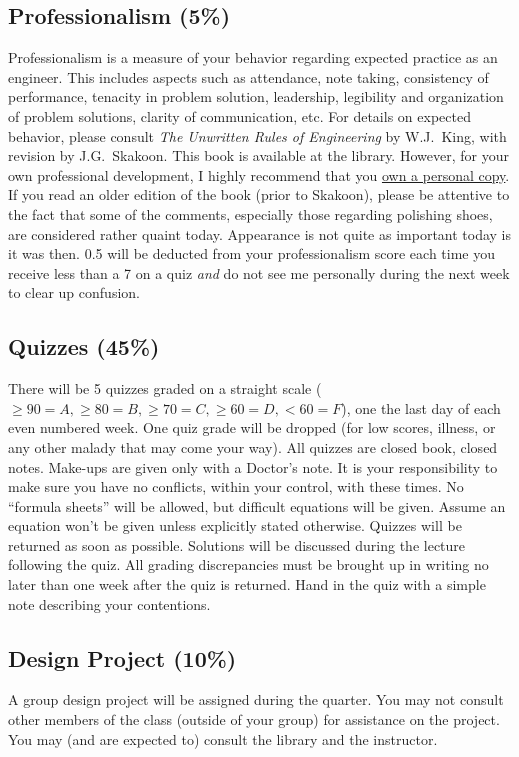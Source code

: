 \documentclass[10pt]{article}
\begin{document}
\subsection*{Professionalism (5\%)}
Professionalism is a measure of your behavior regarding expected practice as an engineer. This includes aspects such as attendance, note taking, consistency of performance, tenacity in problem solution, leadership, legibility and organization of problem solutions, clarity of communication, etc. For details on expected behavior, please consult \emph{The Unwritten Rules of Engineering} by W.J.~King, with revision by  J.G.~Skakoon. This book is available at the library. However, for your own professional development, I highly recommend that you \href{http://members.asme.org/catalog/ItemView.cfm?ItemNumber=801624}{own a personal copy}. If you read an older edition of the book (prior to Skakoon), please be attentive to the fact that some of the comments, especially those regarding polishing shoes, are considered rather quaint today. Appearance is not quite as important today is it was then. 0.5 will be deducted from your professionalism score each time you receive less than a 7 on a quiz \emph{and} do not see me personally during the next week to clear up confusion. 

\subsection*{Quizzes (45\%)}
There will be 5 quizzes graded on a straight scale ($\geq 90 = A,\geq 80 = B, \geq 70 = C, \geq 60 = D, < 60 = F$), one the last day of each even numbered week.  %
One quiz grade will be dropped (for low scores, illness, or any other malady that may come your way).  All quizzes are closed book, closed notes.  Make-ups are given only with a Doctor's note.  It is your responsibility to make sure you have no conflicts, within your control, with these times.  No ``formula sheets'' will be allowed, but difficult equations will be given.  Assume an equation won't be given unless explicitly stated otherwise. Quizzes will be returned as soon as possible.  Solutions will be discussed during the lecture following the quiz.  All grading discrepancies must be brought up in writing no later than one week after the quiz is returned.  Hand in the quiz with a simple note describing your contentions.

\subsection*{Design Project (10\%)}
A group design project will be assigned during the quarter. You may not consult other members of the class (outside of your group) for assistance on the project. You may (and are expected to) consult the library and the instructor.
\end{document}
